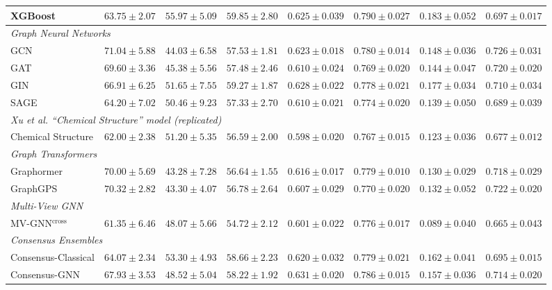 \documentclass[letterpaper]{article}
\begin{document}
\begin{table}[t]
{\begin{tabular}{lccccccc}
XGBoost & $63.75 \pm 2.07$ & {\boldmath$55.97 \pm 5.09$} & {\boldmath$59.85 \pm 2.80$} & $0.625 \pm 0.039$ & \underline{$0.790 \pm 0.027$} & {\boldmath$0.183 \pm 0.052$} & $0.697 \pm 0.017$ \\
\midrule
\multicolumn{8}{l}{\textit{Graph Neural Networks}} \\
\midrule
GCN & {\boldmath$71.04 \pm 5.88$} & $44.03 \pm 6.58$ & $57.53 \pm 1.81$ & $0.623 \pm 0.018$ & $0.780 \pm 0.014$ & $0.148 \pm 0.036$ & \underline{$0.726 \pm 0.031$} \\
GAT & $69.60 \pm 3.36$ & $45.38 \pm 5.56$ & $57.48 \pm 2.46$ & $0.610 \pm 0.024$ & $0.769 \pm 0.020$ & $0.144 \pm 0.047$ & $0.720 \pm 0.020$ \\
GIN & $66.91 \pm 6.25$ & $51.65 \pm 7.55$ & $59.27 \pm 1.87$ & $0.628 \pm 0.022$ & $0.778 \pm 0.021$ & $0.177 \pm 0.034$ & $0.710 \pm 0.034$ \\
SAGE & $64.20 \pm 7.02$ & $50.46 \pm 9.23$ & $57.33 \pm 2.70$ & $0.610 \pm 0.021$ & $0.774 \pm 0.020$ & $0.139 \pm 0.050$ & $0.689 \pm 0.039$ \\
\midrule
\multicolumn{8}{l}{\textit{Xu et al. ``Chemical Structure'' model (replicated)}} \\
\midrule
Chemical Structure & $62.00 \pm 2.38$ & $51.20 \pm 5.35$ & $56.59 \pm 2.00$ & $0.598 \pm 0.020$ & $0.767 \pm 0.015$ & $0.123 \pm 0.036$ & $0.677 \pm 0.012$ \\
\midrule
\multicolumn{8}{l}{\textit{Graph Transformers}} \\
\midrule
Graphormer & $70.00 \pm 5.69$ & $43.28 \pm 7.28$ & $56.64 \pm 1.55$ & $0.616 \pm 0.017$ & $0.779 \pm 0.010$ & $0.130 \pm 0.029$ & $0.718 \pm 0.029$ \\
GraphGPS & $70.32 \pm 2.82$ & $43.30 \pm 4.07$ & $56.78 \pm 2.64$ & $0.607 \pm 0.029$ & $0.770 \pm 0.020$ & $0.132 \pm 0.052$ & $0.722 \pm 0.020$ \\
\midrule
\multicolumn{8}{l}{\textit{Multi-View GNN }} \\
\midrule
MV-GNN$^{\text{cross}}$ & $61.35 \pm 6.46$ & $48.07 \pm 5.66$ & $54.72 \pm 2.12$ & $0.601 \pm 0.022$ & $0.776 \pm 0.017$ & $0.089 \pm 0.040$ & $0.665 \pm 0.043$ \\
\midrule
\multicolumn{8}{l}{\textit{Consensus Ensembles}} \\
\midrule
Consensus-Classical & $64.07 \pm 2.34$ & \underline{$53.30 \pm 4.93$} & $58.66 \pm 2.23$ & $0.620 \pm 0.032$ & $0.779 \pm 0.021$ & $0.162 \pm 0.041$ & $0.695 \pm 0.015$ \\
Consensus-GNN & $67.93 \pm 3.53$ & $48.52 \pm 5.04$ & $58.22 \pm 1.92$ & \underline{$0.631 \pm 0.020$} & $0.786 \pm 0.015$ & $0.157 \pm 0.036$ & $0.714 \pm 0.020$ \\

\end{tabular}}
\end{table}
\end{document}
